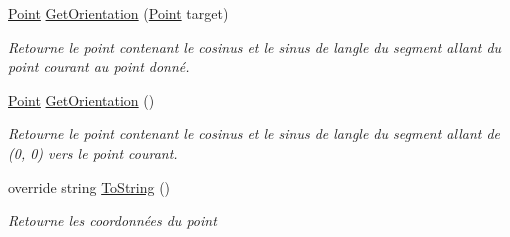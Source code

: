 \begin{DoxyCompactItemize}
\hyperlink{class_tentacle_slicers_1_1general_1_1_point}{Point} \hyperlink{class_tentacle_slicers_1_1general_1_1_point_aeaf223f4a4242ee95a1937e4435ed420}{Get\+Orientation} (\hyperlink{class_tentacle_slicers_1_1general_1_1_point}{Point} target)
\begin{DoxyCompactList}\small\item\em Retourne le point contenant le cosinus et le sinus de l\textquotesingle{}angle du segment allant du point courant au point donné. \end{DoxyCompactList}\item 
\hyperlink{class_tentacle_slicers_1_1general_1_1_point}{Point} \hyperlink{class_tentacle_slicers_1_1general_1_1_point_acf9889a5ce17e162d19b33354e625e54}{Get\+Orientation} ()
\begin{DoxyCompactList}\small\item\em Retourne le point contenant le cosinus et le sinus de l\textquotesingle{}angle du segment allant de (0, 0) vers le point courant. \end{DoxyCompactList}\item 
override string \hyperlink{class_tentacle_slicers_1_1general_1_1_point_ae2810edb6f1fdc509f537bdb47617dbb}{To\+String} ()
\begin{DoxyCompactList}\small\item\em Retourne les coordonnées du point \end{DoxyCompactList}\end{DoxyCompactItemize}
